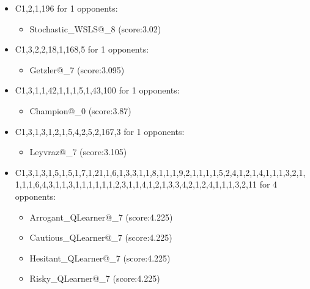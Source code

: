 \begin{appendices}
\begin{itemize}
        \item C1,2,1,196 for 1 opponents:
        \begin{multicols}{3}
            \begin{itemize}
                \item Stochastic\_WSLS@\_8 (score:3.02)
            \end{itemize}
        \end{multicols}

        \item C1,3,2,2,18,1,168,5 for 1 opponents:
        \begin{multicols}{3}
            \begin{itemize}
                \item Getzler@\_7 (score:3.095)
            \end{itemize}
        \end{multicols}

        \item C1,3,1,1,42,1,1,1,5,1,43,100 for 1 opponents:
        \begin{multicols}{3}
            \begin{itemize}
                \item Champion@\_0 (score:3.87)
            \end{itemize}
        \end{multicols}

        \item C1,3,1,3,1,2,1,5,4,2,5,2,167,3 for 1 opponents:
        \begin{multicols}{3}
            \begin{itemize}
                \item Leyvraz@\_7 (score:3.105)
            \end{itemize}
        \end{multicols}

        \item C1,3,1,3,1,5,1,5,1,7,1,21,1,6,1,3,3,1,1,8,1,1,1,9,2,1,1,1,1,5,2,4,1,2,1,4,1,1,1,3,2,1,1,1,1,6,4,3,1,1,3,1,1,1,1,1,1,2,3,1,1,4,1,2,1,3,3,4,2,1,2,4,1,1,1,3,2,11 for 4 opponents:
        \begin{multicols}{3}
            \begin{itemize}
                \item Arrogant\_QLearner@\_7 (score:4.225)
                \item Cautious\_QLearner@\_7 (score:4.225)
                \item Hesitant\_QLearner@\_7 (score:4.225)
                \item Risky\_QLearner@\_7 (score:4.225)
            \end{itemize}
        \end{multicols}


\end{itemize}
\end{appendices}
